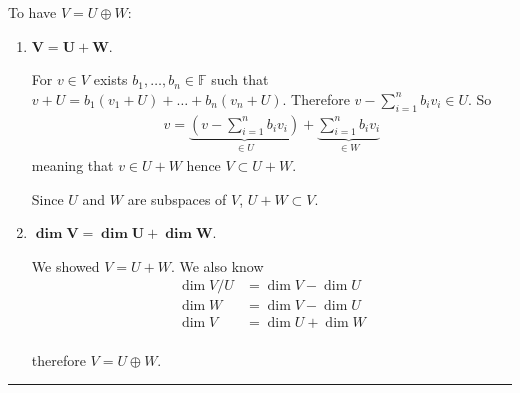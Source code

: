 \documentclass[12pt, letterpaper]{scrartcl}
\newcommand{\F}{\mathbb{F}}
\begin{document}
To have $V=U\oplus W$:
\begin{enumerate}
    \item $\mathbf{V= U+ W}$.

    For $v\in V$ exists $b_1,\dots,b_n\in\F$ such that $v+U=b_1(v_1+U)+\dots+b_n(v_n+U)$. Therefore $v-\sum_{i=1}^nb_iv_i\in U$. So
    \begin{align*}
        v = \underbrace{(v-\sum_{i=1}^nb_iv_i)}_{\in U} + \underbrace{\sum_{i=1}^nb_iv_i}_{\in W}
    \end{align*}
    meaning that $v\in U+W$ hence $V\subset U+W$. 

    Since $U$ and $W$ are subspaces of $V$, $U+W\subset V$.
    
    \item %
    $\mathbf{\dim V = \dim U + \dim W}$.

    We showed $V=U+W$. We also know
    \begin{align*}
        \dim V/U &= \dim V -\dim U\\
        \dim W &=  \dim V -\dim U\\
        \dim V &=  \dim U +\dim W\\
    \end{align*}

    therefore $V=U\oplus W$.

\end{enumerate}
\vskip1mm\hrule
\end{document}
